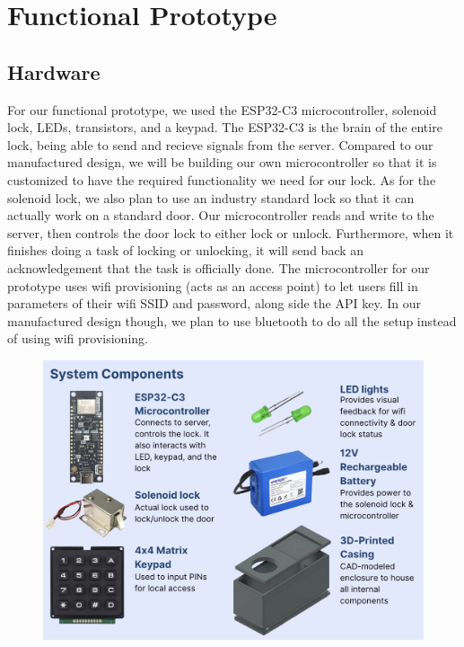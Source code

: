 \newpage %
\section{Functional Prototype}


\subsection{Hardware}

For our functional prototype, we used the ESP32-C3 microcontroller, solenoid lock, LEDs, transistors, and a keypad. The ESP32-C3 is the brain of the entire lock, being able to send and recieve signals from the server. Compared to our manufactured design, we will be building our own microcontroller so that it is customized to have the required functionality we need for our lock. As for the solenoid lock, we also plan to use an industry standard lock so that it can actually work on a standard door. Our microcontroller reads and write to the server, then controls the door lock to either lock or unlock. Furthermore, when it finishes doing a task of locking or unlocking, it will send back an acknowledgement that the task is officially done. The microcontroller for our prototype uses wifi provisioning (acts as an access point) to let users fill in parameters of their wifi SSID and password, along side the API key. In our manufactured design though, we plan to use bluetooth to do all the setup instead of using wifi provisioning.

\begin{figure}[!ht]
    \centering
    \includegraphics[width=1\textwidth]{img/hardwareComponents.png}
    \label{fig:hardwareComponents}
\end{figure}

